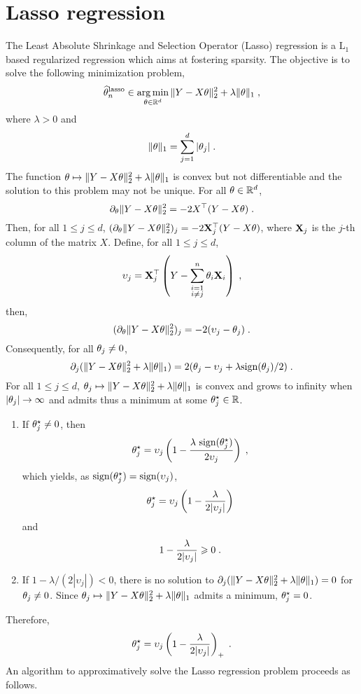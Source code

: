 \section{Lasso regression}
The Least Absolute Shrinkage and Selection Operator (Lasso) regression is a $\mathrm{L}_1$ based regularized regression which aims at fostering sparsity. The objective is to solve the following minimization problem,
\[
\widehat \param^{\mathrm{lasso}}_n\in  \argmin_{\param\in\rset^d}  \|Y - X\param\|_2^2 + \lambda\|\param\|_1\eqsp,
\]
where $\lambda>0$ and
\[
\|\theta\|_1 = \sum_{j=1}^d|\theta_j|\;.
\]
The function $\theta \mapsto \|Y - X\theta\|_2^2 + \lambda\|\theta\|_1$ is convex but not differentiable and the solution to this problem may  not be unique. For all $\theta \in \mathbb{R}^d$,  
\[
\partial_\theta \|Y - X\theta\|_2^2 = - 2 X^\top (Y-X\theta)\;.
\]
Then, for all $1\leqslant j \leqslant d$, $(\partial_\theta \|Y - X\theta\|_2^2)_j = -2 {\bf X}^\top_j (Y-X\theta)$, where ${\bf X}_j$ is the $j$-th column of the matrix $X$. Define, for all $1\leqslant j \leqslant d$,
\[
\upsilon_{j}={\bf X}^\top_{j}\left(Y-\sum_{\substack{i=1\\ i\neq j}}^n\theta_{i}{\bf X}_{i}\right)\;,
\]
then,
\[
(\partial_\theta \|Y - X\theta\|_2^2)_j = -2( \upsilon_j - \theta_j)\;.
\]
Consequently, for all $\theta_j \neq 0$, 
\[
\partial_j ( \|Y - X\theta\|_2^2 +  \lambda\|\theta\|_1)= 2( \theta_j - \upsilon_j + \lambda\textrm{sign}(\theta_j)/2)\;.
\]
For all $1\leqslant j\leqslant d$,  $\theta_j \mapsto  \|Y - X\theta\|_2^2 + \lambda\|\theta\|_1$ is convex and grows to infinity when $|\theta_j|\to \infty$ and admits thus a minimum at some $\theta_j^{\star}\in\mathbb{R}$. 
\begin{enumerate}[-]
\item If $\theta_j^{\star} \neq 0$, then
\[
\theta_j^{\star} = \upsilon_j\left( 1 - \frac{\lambda ~\textrm{sign}(\theta_j^{\star})}{2 \upsilon_j}\right)\;,
\]
which yields, as  $\textrm{sign}(\theta_j^{\star}) = \textrm{sign}(\upsilon_j)$,
\[
\theta_j^{\star} = \upsilon_j\left(1 - \frac{\lambda}{2 |\upsilon_j|}\right)
\]
and
\[
1 - \frac{\lambda}{2 |\upsilon_j|} \geqslant 0\;.
\]
\item If $1 - \lambda/(2 |\upsilon_j|)<0$, there is no solution to $\partial_j ( \|Y - X\theta\|_2^2 +  \lambda\|\theta\|_1)=0$ for $\theta_j \neq 0$.  Since $\theta_j \mapsto  \|Y - X\theta\|_2^2 + \lambda\|\theta\|_1$ admits a minimum, $\theta_j^{\star}=0$. 
\end{enumerate}
Therefore,
\[
\theta_j^{\star} = \upsilon_j\left( 1 - \frac{\lambda}{2 |\upsilon_j|}\right)_+\;.
\]
An algorithm to approximatively solve the Lasso regression problem proceeds as follows.
